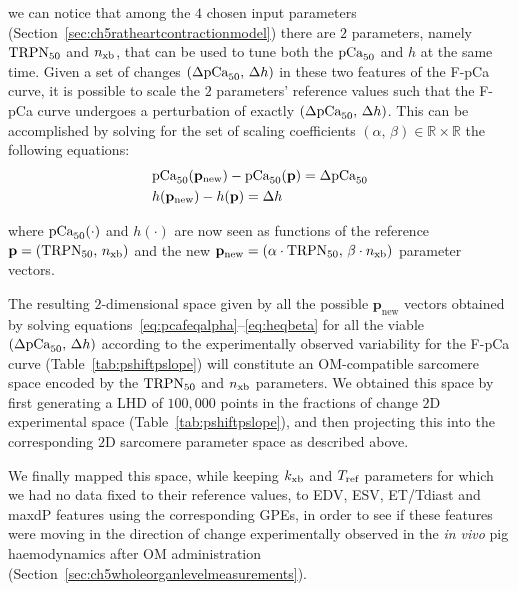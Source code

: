 \noindent
we can notice that among the $4$ chosen input parameters (Section~\ref{sec:ch5ratheartcontractionmodel}) there are $2$ parameters, namely $\textrm{TRPN}_{50}$ and $n_{\textrm{xb}}$, that can be used to tune both the $\textrm{pCa}_{50}$ and $h$ at the same time. Given a set of changes $(\Delta\textrm{pCa}_{50},\,\Delta h)$ in these two features of the F-pCa curve, it is possible to scale the $2$ parameters' reference values such that the F-pCa curve undergoes a perturbation of exactly $(\Delta\textrm{pCa}_{50},\,\Delta h)$. This can be accomplished by solving for the set of scaling coefficients $(\alpha,\,\beta)\in\mathbb{R}\times\mathbb{R}$ the following equations:
%
\begin{align}
    & \textrm{pCa}_{50}(\mathbf{p}_{\textrm{new}}) - \textrm{pCa}_{50}(\mathbf{p}) = \Delta\textrm{pCa}_{50} \label{eq:pcafeqalpha} \\
    & h(\mathbf{p}_{\textrm{new}}) - h(\mathbf{p}) = \Delta h \label{eq:heqbeta}
\end{align}

\vspace{0.2cm}\noindent
where $\textrm{pCa}_{50}(\cdot)$ and $h(\cdot)$ are now seen as functions of the reference $\mathbf{p}=(\textrm{TRPN}_{50},\,n_{\textrm{xb}})$ and the new $\mathbf{p}_{\textrm{new}}=(\alpha\cdot\textrm{TRPN}_{50},\,\beta\cdot n_{\textrm{xb}})$ parameter vectors.

\vspace{0.2cm}
The resulting $2$-dimensional space given by all the possible $\mathbf{p}_{\textrm{new}}$ vectors obtained by solving equations~\ref{eq:pcafeqalpha}--\ref{eq:heqbeta} for all the viable $(\Delta\textrm{pCa}_{50},\,\Delta h)$ according to the experimentally observed variability for the F-pCa curve (Table~\ref{tab:pshiftpslope}) will constitute an OM-compatible sarcomere space encoded by the $\textrm{TRPN}_{50}$ and $n_{\textrm{xb}}$ parameters. We obtained this space by first generating a LHD of $100,000$ points in the fractions of change $2$D experimental space (Table~\ref{tab:pshiftpslope}), and then projecting this into the corresponding $2$D sarcomere parameter space as described above.

\vspace{0.2cm}
We finally mapped this space, while keeping $k_{\textrm{xb}}$ and $T_{\textrm{ref}}$ parameters for which we had no data fixed to their reference values, to EDV, ESV, ET/Tdiast and maxdP features using the corresponding GPEs, in order to see if these features were moving in the direction of change experimentally observed in the \textit{in vivo} pig haemodynamics after OM administration (Section~\ref{sec:ch5wholeorganlevelmeasurements}).


%
%
%
